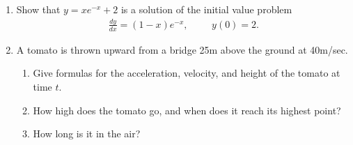 \documentclass[12pt]{article}
\begin{document}
\begin{enumerate}
  \vfill

\item Show that $y=xe^{-x}+2$ is a solution of the initial value problem
  \begin{align*}
  \frac{dy}{dx} = (1-x)e^{-x},&&& y(0)=2.
  \end{align*}

  \vfill

  \newpage

\item A tomato is thrown upward from a bridge 25m above the ground at
  40m/sec.
  \begin{enumerate}
  \item Give formulas for the acceleration, velocity, and height of
    the tomato at time $t$.

    \vfill
    
  \item How high does the tomato go, and when does it reach its
    highest point?

    \vfill
    
  \item How long is it in the air?

    \vfill
    
  \end{enumerate}

\end{enumerate}
\end{document}

